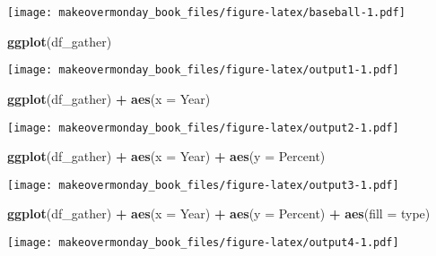 \documentclass[]{book}
\newenvironment{Shaded}{\begin{snugshade}}{\end{snugshade}}
\newcommand{\KeywordTok}[1]{\textcolor[rgb]{0.13,0.29,0.53}{\textbf{#1}}}
\newcommand{\DataTypeTok}[1]{\textcolor[rgb]{0.13,0.29,0.53}{#1}}
\newcommand{\StringTok}[1]{\textcolor[rgb]{0.31,0.60,0.02}{#1}}
\newcommand{\OperatorTok}[1]{\textcolor[rgb]{0.81,0.36,0.00}{\textbf{#1}}}
\newcommand{\NormalTok}[1]{#1}
\theoremstyle{definition}
\theoremstyle{definition}
\theoremstyle{definition}
\theoremstyle{remark}
\begin{document}
\texttt{[image: makeovermonday\_book\_files/figure-latex/baseball-1.pdf]}

\clearpage

\begin{Shaded}
\begin{Highlighting}[]
\KeywordTok{ggplot}\NormalTok{(df_gather) }
\end{Highlighting}
\end{Shaded}

\texttt{[image: makeovermonday\_book\_files/figure-latex/output1-1.pdf]}

\clearpage

\begin{Shaded}
\begin{Highlighting}[]
\KeywordTok{ggplot}\NormalTok{(df_gather) }\OperatorTok{+}
\StringTok{  }\KeywordTok{aes}\NormalTok{(}\DataTypeTok{x =}\NormalTok{ Year) }
\end{Highlighting}
\end{Shaded}

\texttt{[image: makeovermonday\_book\_files/figure-latex/output2-1.pdf]}

\clearpage

\begin{Shaded}
\begin{Highlighting}[]
\KeywordTok{ggplot}\NormalTok{(df_gather) }\OperatorTok{+}
\StringTok{  }\KeywordTok{aes}\NormalTok{(}\DataTypeTok{x =}\NormalTok{ Year) }\OperatorTok{+}
\StringTok{  }\KeywordTok{aes}\NormalTok{(}\DataTypeTok{y =}\NormalTok{ Percent) }
\end{Highlighting}
\end{Shaded}

\texttt{[image: makeovermonday\_book\_files/figure-latex/output3-1.pdf]}

\clearpage

\begin{Shaded}
\begin{Highlighting}[]
\KeywordTok{ggplot}\NormalTok{(df_gather) }\OperatorTok{+}
\StringTok{  }\KeywordTok{aes}\NormalTok{(}\DataTypeTok{x =}\NormalTok{ Year) }\OperatorTok{+}
\StringTok{  }\KeywordTok{aes}\NormalTok{(}\DataTypeTok{y =}\NormalTok{ Percent) }\OperatorTok{+}
\StringTok{  }\KeywordTok{aes}\NormalTok{(}\DataTypeTok{fill =}\NormalTok{ type) }
\end{Highlighting}
\end{Shaded}

\texttt{[image: makeovermonday\_book\_files/figure-latex/output4-1.pdf]}
\end{document}
